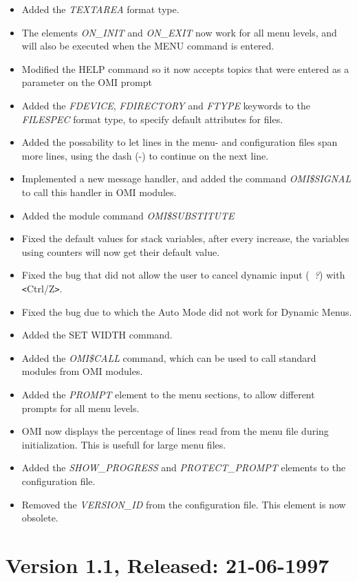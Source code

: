 \documentclass[a4paper]{book}
\newcommand{\lt}{\texttt{<}}
\newcommand{\gt}{\texttt{>}}
\begin{document}
\begin{itemize}
\item Added the \textsl{TEXTAREA} format type.
\item The elements \textsl{ON{\_}INIT} and \textsl{ON{\_}EXIT} now work for all menu levels, and will also be executed when the \textsf{MENU} command is entered.
\item Modified the \textsf{HELP} command so it now accepts topics that were entered as a parameter on the OMI prompt
\item Added the \textsl{FDEVICE}, \textsl{FDIRECTORY} and \textsl{FTYPE} keywords to the \textsl{FILESPEC} format type, to specify default attributes for files.
\item Added the possability to let lines in the menu- and configuration files span more lines, using the dash (-) to continue on the next line.
\item Implemented a new message handler, and added the command \textsl{OMI{\$}SIGNAL} to call this handler in OMI modules.
\item Added the module command \textsl{OMI{\$}SUBSTITUTE}
\item Fixed the default values for stack variables, after every increase, the variables using counters will now get their default value.
\item Fixed the bug that did not allow the user to cancel dynamic input (\textsl{~?}) with \lt Ctrl/Z\gt.
\item Fixed the bug due to which the Auto Mode did not work for Dynamic Menus.
\item Added the \textsf{SET WIDTH} command.
\item Added the \textsl{OMI{\$}CALL} command, which can be used to call standard modules from OMI modules.
\item Added the \textsl{PROMPT} element to the menu sections, to allow different prompts for all menu levels.
\item OMI now displays the percentage of lines read from the menu file during initialization. This is usefull for large menu files.
\item Added the \textsl{SHOW{\_}PROGRESS} and \textsl{PROTECT{\_}PROMPT} elements to the configuration file.
\item Removed the \textsl{VERSION{\_}ID} from the configuration file. This element is now obsolete.
\end{itemize}

\section*{Version 1.1, Released: 21-06-1997}
\end{document}
